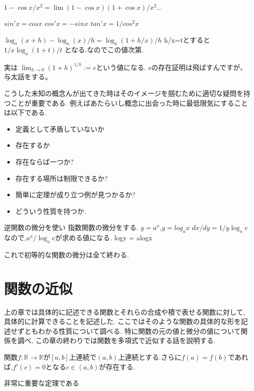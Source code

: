 \documentclass{ujarticle}
\begin{document}
\begin{prop}[三角関数の微分]
$1-\cos x/x^2 = \lim (1 - \cos x)(1 + \cos x)/x^2 ...$

$sin'x =cosx$
$cos'x = - sinx$
$tan'x = 1/ cos^2x$
\end{prop}


\begin{prop}[対数関数の微分]
$\log_a(x+h) - \log_a(x)/h = \log_a(1+h/x)/h$
h/x=tとすると $ 1/x \log_a(1+t)/t$
となる.なのでこの値次第.
\end{prop}


実は
$\lim_{h \to 0} (1 +h)^{1/h}:=e$という値になる.
eの存在証明は飛ばすんですが、与太話をする。

\begin{rem}
こうした未知の概念んが出てきた時はそのイメージを掴むために適切な疑問を持つことが重要である.
例えばあたらいし概念に出会った時に最低限気にすることは以下である.
\begin{itemize}
  \item 定義として矛盾していないか
  \item 存在するか
  \item 存在ならば一つか?
  \item 存在する場所は制限できるか?
  \item 簡単に定理が成り立つ例が見つかるか?
  \item どういう性質を持つか.
\end{itemize}
\end{rem}


\begin{prop}[指数関数の微分]
逆関数の微分を使い
指数関数の微分をする.
$y= a^x$,$y= log_ax$
$dx/dy = 1/y \log_ae$なので,$a^x/\log_ae$が求める値になる.
logy = alogx
\end{prop}

これで初等的な関数の微分は全て終わる.

\section{関数の近似}
上の章では具体的に記述できる関数とそれらの合成や積で表せる関数に対して,具体的に計算できることを記述した.
ここではそのような関数の具体的な形を記述せずともわかる性質について調べる.
特に関数の元の値と微分の値について関係を調べ,
この章の終わりでは関数を多項式で近似する話を説明する.

\begin{thm}[ロルの定理]
関数$f: \mathbb{R} \to \mathbb{R}$が$[a, b]$上連続で$(a, b)$上連続とする.さらに$f(a) = f(b)$であれば,$f'(c) = 0$となる$c \in (a,b)$が存在する.
\end{thm}
非常に重要な定理である
\end{document}
